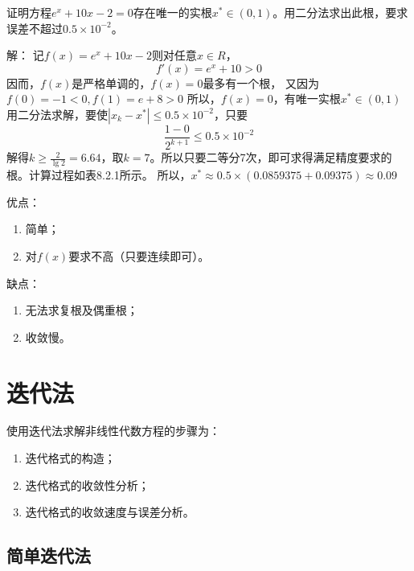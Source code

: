 \begin{example}
    证明方程$e^x+10x-2 = 0$存在唯一的实根$x^* \in (0,1)$。用二分法求出此根，要求误差不超过$0.5 \times 10^{-2}$。
    \begin{solution}
    解：
        记$f(x) = e^x+10x-2$则对任意$x \in R$，
        \begin{equation*}
            f'(x) = e^x+10 > 0
        \end{equation*}
        因而，$f(x)$是严格单调的，$f(x) = 0$最多有一个根，
        又因为$f(0) = -1 < 0,f(1) = e+8 > 0$
        所以，$f(x) = 0$，有唯一实根$x^* \in (0,1)$
        用二分法求解，要使$|x_k-x^*| \leq 0.5 \times 10^{-2}$，只要
        \begin{equation*}
            \frac{1-0}{2^{k+1}} \leq 0.5 \times 10^{-2}
        \end{equation*}
        解得$k \geq \frac{2}{\lg 2} = 6.64$，取$k = 7$。所以只要二等分7次，即可求得满足精度要求的根。计算过程如表8.2.1所示。
        所以，$x^* \approx 0.5 \times (0.0859375+0.09375) \approx 0.09$ 
    \end{solution}
 \end{example}

\begin{extend}[二分法的优缺点]
    优点：\begin{enumerate}
        \item 简单；
        \item 对$f(x)$要求不高（只要连续即可）。
    \end{enumerate}
    缺点：\begin{enumerate}
        \item 无法求复根及偶重根；
        \item 收敛慢。
    \end{enumerate}
\end{extend}

\section{迭代法}

使用迭代法求解非线性代数方程的步骤为：
\begin{enumerate}
    \item 迭代格式的构造；
    \item 迭代格式的收敛性分析；
    \item 迭代格式的收敛速度与误差分析。
\end{enumerate}

\subsection{简单迭代法}

